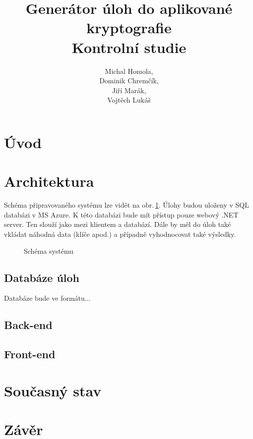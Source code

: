 \documentclass[titlepage]{article}
\title{Generátor úloh do aplikované kryptografie\\Kontrolní studie}
\author{Michal Homola,\\Dominik Chremčík,\\Jiří Marák,\\Vojtěch Lukáš}
\begin{document}
\maketitle

\tableofcontents

\section*{Úvod}

\section{Architektura}
Schéma připravovaného systému lze vidět na obr.\,\ref{fig:sys}. Úlohy budou uloženy v SQL databázi v MS Azure. K této databázi bude mít přístup pouze webový .NET server. Ten slouží jako  mezi klientem a databází. Dále by měl do úloh také vkládat náhodná data (klíče apod.) a případně vyhodnocovat také výsledky. 
\begin{figure}[h!]
    \centering
        
    \caption{Schéma systému}
    \label{fig:sys}
\end{figure}




\subsection{Databáze úloh}
Databáze bude ve formátu...

\subsection{Back-end}


\subsection{Front-end}

\section{Současný stav}

\section*{Závěr}
\end{document}
